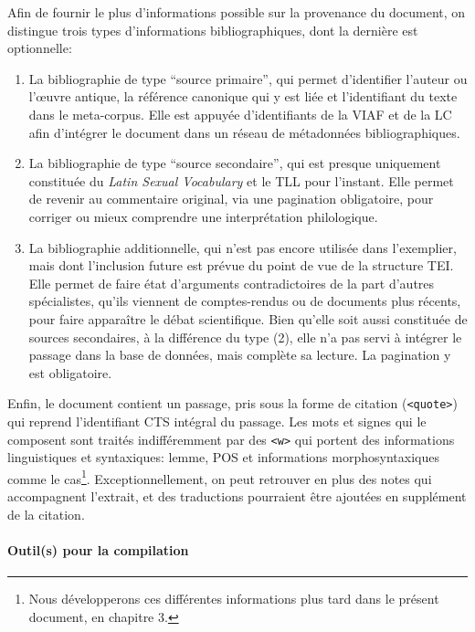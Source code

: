 Afin de fournir le plus d'informations possible sur la provenance du document, on distingue trois types d'informations bibliographiques, dont la dernière est optionnelle:
\begin{enumerate}
    \item La bibliographie de type \enquote{source primaire}, qui permet d'identifier l'auteur ou l'œuvre antique, la référence canonique qui y est liée et l'identifiant du texte dans le meta-corpus. Elle est appuyée d'identifiants de la \acrfull{VIAF} et de la \acrfull{LC} afin d'intégrer le document dans un réseau de métadonnées bibliographiques.
    \item La bibliographie de type \enquote{source secondaire}, qui est presque uniquement constituée du \textit{Latin Sexual Vocabulary} et le TLL pour l'instant. Elle permet de revenir au commentaire original, via une pagination obligatoire, pour corriger ou mieux comprendre une interprétation philologique.
    \item La bibliographie additionnelle, qui n'est pas encore utilisée dans l'exemplier, mais dont l'inclusion future est prévue du point de vue de la structure TEI. Elle permet de faire état d'arguments contradictoires de la part d'autres spécialistes, qu'ils viennent de comptes-rendus ou de documents plus récents, pour faire apparaître le débat scientifique. Bien qu'elle soit aussi constituée de sources secondaires, à la différence du type (2), elle n'a pas servi à intégrer le passage dans la base de données, mais complète sa lecture. La pagination y est obligatoire.
\end{enumerate}

Enfin, le document contient un passage, pris sous la forme de citation (\texttt{<quote>}) qui reprend l'identifiant CTS intégral du passage. Les mots et signes qui le composent sont traités indifféremment par des \texttt{<w>} qui portent des informations linguistiques et syntaxiques: lemme, POS et informations morphosyntaxiques comme le cas\footnote{Nous développerons ces différentes informations plus tard dans le présent document, en chapitre 3.}. Exceptionnellement, on peut retrouver en plus des notes qui accompagnent l'extrait, et des traductions pourraient être ajoutées en supplément de la citation.

\paragraph{Outil(s) pour la compilation}

